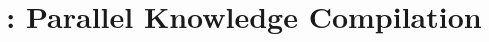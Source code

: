 \documentclass[10pt,conference]{llncs2e/llncs}
\title{\toolname: Parallel Knowledge Compilation}
\begin{document}
\maketitle

\begin{abstract}

\end{abstract}




%
%
%





%
\end{document}
